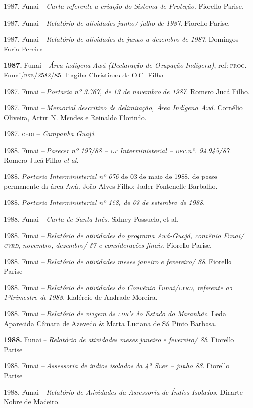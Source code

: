 \begin{bibliohedra}
1987. Funai -- \emph{Carta referente a criação do Sistema de
Proteção}. Fiorello Parise.

1987. Funai -- \emph{Relatório de atividades junho/ julho de
1987}. Fiorello Parise.

1987. Funai -- \emph{Relatório de atividades de junho a dezembro
de 1987}. Domingos Faria Pereira.

\textbf{1987.} Funai -- \emph{Área indígena Awá (Declaração de Ocupação
Indígena)}, ref: \textsc{proc}. Funai/\textsc{bsb}/2582/85. Itagiba Christiano de O.C.
Filho.

1987. Funai -- \emph{Portaria nº 3.767, de 13 de novembro de
1987.} Romero Jucá Filho.

1987. Funai -- \emph{Memorial descritivo de delimitação, Área
Indígena Awá}. Cornélio Oliveira, Artur N. Mendes e Reinaldo Florindo.

1987. \textsc{cedi} -- \emph{Campanha Guajá}.

1988. Funai -- \emph{Parecer nº 197/88 -- \textsc{gt} Interministerial
-- \textsc{dec}.nº. 94.945/87}. Romero Jucá Filho \emph{et al}.

1988. \emph{Portaria Interministerial nº 076} de 03 de maio de
1988, de posse permanente da área Awá. João Alves Filho; Jader
Fontenelle Barbalho.

1988. \emph{Portaria Interministerial nº 158, de 08 de setembro
de 1988}.

1988. Funai -- \emph{Carta de Santa Inês}. Sidney Possuelo, et
al.

1988. Funai -- \emph{Relatório de atividades do programa
Awá-Guajá, convênio Funai/ \textsc{cvrd}, novembro, dezembro/ 87 e considerações
finais}. Fiorello Parise.

1988. Funai -- \emph{Relatório de atividades meses janeiro e
fevereiro/ 88}. Fiorello Parise.

1988. Funai -- \emph{Relatório de atividades do Convênio
Funai/\textsc{cvrd}, referente ao 1ºtrimestre de 1988}. Idalércio de Andrade
Moreira.

1988. Funai -- \emph{Relatório de viagem às \textsc{adr}'s do Estado do
Maranhão}. Leda Aparecida Câmara de Azevedo \& Marta Luciana de Sá Pinto
Barbosa.

\textbf{1988.} Funai -- \emph{Relatório de atividades meses janeiro e
fevereiro/ 88}. Fiorello Parise.

1988. Funai -- \emph{Assessoria de índios isolados da 4ª Suer
-- junho 88}. Fiorello Parise.

1988. Funai -- \emph{Relatório de Atividades da Assessoria de
Índios Isolados}. Dinarte Nobre de Madeiro.


\end{bibliohedra}
